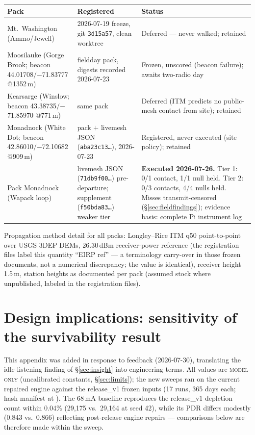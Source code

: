 \documentclass[11pt]{article}
\newcommand{\modelonly}{\textsc{model-only}}
\newcommand{\code}[1]{\texttt{\small #1}}
\begin{document}
\begin{table}[h]
\small
\begin{tabularx}{\textwidth}{@{}p{3.4cm}p{4.6cm}X@{}}
\toprule
\textbf{Pack} & \textbf{Registered} & \textbf{Status} \\
\midrule
Mt.~Washington (Ammo/Jewell) & 2026-07-19 freeze, git \code{3d15a57}, clean worktree & Deferred --- never walked; retained \\
Moosilauke (Gorge Brook; beacon 44.01708/$-$71.83777 @1352\,m) & fieldday pack, digests recorded 2026-07-23 & Frozen, unscored (beacon failure); awaits two-radio day \\
Kearsarge (Winslow; beacon 43.38735/$-$71.85970 @771\,m) & same pack & Deferred (ITM predicts no public-mesh contact from site); retained \\
Monadnock (White Dot; beacon 42.86010/$-$72.10682 @909\,m) & pack $+$ livemesh JSON (\code{aba23c13\ldots}), 2026-07-23 & Registered, never executed (site policy); retained \\
Pack Monadnock (Wapack loop) & livemesh JSON (\code{71db9f00\ldots}) pre-departure; supplement (\code{f50bda83\ldots}) weaker tier & \textbf{Executed 2026-07-26.} Tier 1: 0/1 contact, 1/1 null held. Tier 2: 0/3 contacts, 4/4 nulls held. Misses transmit-censored (\S\ref{sec:fieldfindings}); evidence basis: complete Pi instrument log \\
\bottomrule
\end{tabularx}
\end{table}

Propagation method detail for all packs: Longley--Rice ITM q50 point-to-point
over USGS 3DEP DEMs, 26.30\,dBm receiver-power reference (the registration files label this quantity ``EIRP ref'' --- a terminology carry-over in those frozen documents, not a numerical discrepancy; the value is identical), receiver height 1.5\,m, station heights as documented per pack (assumed stock where
unpublished, labeled in the registration files).


\section{Design implications: sensitivity of the survivability result}\label{app:design}

This appendix was added in response to feedback (2026-07-30), translating the
idle-listening finding of \S\ref{sec:insight} into engineering terms. All
values are \modelonly{} (uncalibrated constants, \S\ref{sec:limits}); the new
sweeps ran on the current repaired engine against the release\_v1 frozen
inputs (17 runs, 365 days each; hash manifest at
). The 68\,mA baseline reproduces the
release\_v1 depletion count within 0.04\% (29{,}175 vs.\ 29{,}164 at seed 42),
while its PDR differs modestly (0.843 vs.\ 0.866) reflecting post-release
engine repairs --- comparisons below are therefore made within the sweep.
\end{document}
